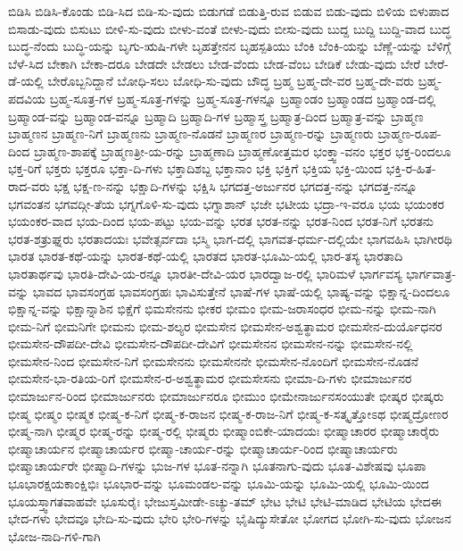 {ಬಿಡಿಸಿ
ಬಿಡಿಸಿ-ಕೊಂಡು
ಬಿಡಿ-ಸಿದ
ಬಿಡಿ-ಸು-ವುದು
ಬಿಡುಗಡೆ
ಬಿಡುತ್ತಿ-ರುವ
ಬಿಡುವ
ಬಿಡು-ವುದು
ಬಿಳಿಯ
ಬಿಳುಪಾದ
ಬಿಸಾಡು-ವುದು
ಬಿಸುಟು
ಬೀಳಿ-ಸು-ವುದು
ಬೀಳು-ವಂತೆ
ಬೀಳು-ವುದು
ಬೀಸು-ವುದು
ಬುದ್ದ
ಬುದ್ದಿ
ಬುದ್ದಿ-ವಾದ
ಬುದ್ಧ
ಬುದ್ಧ-ನೆಂದು
ಬುದ್ಧಿ-ಯನ್ನು
ಬೃಗು-ಋಷಿ-ಗಳೇ
ಬೃಹತ್ತೇನನ
ಬೃಹಸ್ಪತಿಯು
ಬೆಂಕಿ
ಬೆಂಕಿ-ಯನ್ನು
ಬೆಣ್ಣೆ-ಯನ್ನು
ಬೆಳಿಗ್ಗೆ
ಬೆಳೆ-ಸಿದ
ಬೇಕಾಗಿ
ಬೇಕಾ-ದರೂ
ಬೇಡದೇ
ಬೇಡಲು
ಬೇಡ-ವೆಂದು
ಬೇಡ-ವೆಂಬ
ಬೇಡಿಕೆ
ಬೇಡು-ವುದು
ಬೇರೆ
ಬೇರೆ-ಡೆ-ಯಲ್ಲಿ
ಬೇರೊಬ್ಬನಿದ್ದಾನೆ
ಬೋಧಿ-ಸಲು
ಬೋಧಿ-ಸು-ವುದು
ಬೌದ್ಧ
ಬ್ರಹ್ಮ
ಬ್ರಹ್ಮ-ದೇ-ವರ
ಬ್ರಹ್ಮ-ದೇ-ವರು
ಬ್ರಹ್ಮ-ಪದವಿಯ
ಬ್ರಹ್ಮ-ಸೂತ್ರ-ಗಳ
ಬ್ರಹ್ಮ-ಸೂತ್ರ-ಗಳನ್ನು
ಬ್ರಹ್ಮ-ಸೂತ್ರ-ಗಳನ್ನೂ
ಬ್ರಹ್ಮಾಂಡಂ
ಬ್ರಹ್ಮಾಂಡದ
ಬ್ರಹ್ಮಾಂಡ-ದಲ್ಲಿ
ಬ್ರಹ್ಮಾಂಡ-ವನ್ನು
ಬ್ರಹ್ಮಾಂಡ-ವನ್ನೂ
ಬ್ರಹ್ಮಾದಿ
ಬ್ರಹ್ಮಾದಿ-ಗಳ
ಬ್ರಹ್ಮಾಸ್ತ್ರ
ಬ್ರಹ್ಮಾತ್ರ-ದಿಂದ
ಬ್ರಹ್ಮಾತ್ರ-ವನ್ನು
ಬ್ರಾಹ್ಮಣ
ಬ್ರಾಹ್ಮಣನ
ಬ್ರಾಹ್ಮಣ-ನಿಗೆ
ಬ್ರಾಹ್ಮಣನು
ಬ್ರಾಹ್ಮಣ-ನೊಡನೆ
ಬ್ರಾಹ್ಮಣರ
ಬ್ರಾಹ್ಮಣ-ರನ್ನು
ಬ್ರಾಹ್ಮಣರು
ಬ್ರಾಹ್ಮಣ-ರೂಪ-ದಿಂದ
ಬ್ರಾಹ್ಮಣ-ಶಾಪಕ್ಕೆ
ಬ್ರಾಹ್ಮಣತ್ರೀ-ಯ-ರನ್ನು
ಬ್ರಾಹ್ಮಣಾದಿ
ಬ್ರಾಹ್ಮಣೋತ್ತಮರ
ಭಂಕ್ತ್ವಾ-ವನಂ
ಭಕ್ತರ
ಭಕ್ತ-ರಿಂದಲೂ
ಭಕ್ತ-ರಿಗೆ
ಭಕ್ತರು
ಭಕ್ತರೂ
ಭಕ್ತಾ-ದಿ-ಗಳು
ಭಕ್ತಾದಿಶಬ್ದ
ಭಕ್ತಾನಾಂ
ಭಕ್ತಿ
ಭಕ್ತಿಗೆ
ಭಕ್ತಿಯ
ಭಕ್ತಿ-ಯಿಂದ
ಭಕ್ತಿ-ರ-ಹಿತ-ರಾದ-ವರು
ಭಕ್ಷ
ಭಕ್ಷ-ಣ-ನನ್ನು
ಭಕ್ಷಾದಿ-ಗಳನ್ನು
ಭಕ್ಷಿಸಿ
ಭಗದತ್ತ-ಅರ್ಜುನರ
ಭಗದತ್ತ-ನನ್ನು
ಭಗದತ್ತ-ನನ್ನೂ
ಭಗವಂತನ
ಭಗವದ್ಗೀ-ತೆಯ
ಭಗ್ನಗೊಳಿ-ಸು-ವುದು
ಭಗ್ನಾಶಾನ್
ಭಜೇ
ಭಟೀಯ
ಭದ್ರಾ-ಇ-ವರೂ
ಭಯ
ಭಯಂಕರ
ಭಯಂಕರ-ವಾದ
ಭಯ-ದಿಂದ
ಭಯ-ಪಟ್ಟು
ಭಯ-ವನ್ನು
ಭರತ
ಭರತ-ನನ್ನು
ಭರತ-ನಿಂದ
ಭರತ-ನಿಗೆ
ಭರತನು
ಭರತ-ಶತ್ರುಘ್ನರು
ಭರತಾದಯಃ
ಭವೇತ್ಸರ್ವದಾ
ಭಸ್ಮಿ
ಭಾಗ-ದಲ್ಲಿ
ಭಾಗವತ-ಧರ್ಮ-ದಲ್ಲಿಯೇ
ಭಾಗವಹಿಸಿ
ಭಾಗೀರಥಿ
ಭಾರತ
ಭಾರತ-ಕಥೆ-ಯನ್ನು
ಭಾರತ-ಕಥೆ-ಯಲ್ಲಿ
ಭಾರತದ
ಭಾರತ-ಭೂಮಿ-ಯಲ್ಲಿ
ಭಾರ-ತಸ್ಯ
ಭಾರತಾದಿ
ಭಾರತಾರ್ಥವು
ಭಾರತಿ-ದೇವಿ-ಯ-ರನ್ನೂ
ಭಾರತೀ-ದೇವಿ-ಯರ
ಭಾರದ್ವಾಜ-ರಲ್ಲಿ
ಭಾರಿಮಳೆ
ಭಾರ್ಗವಸ್ಯ
ಭಾರ್ಗವಾತ್ರ-ವನ್ನು
ಭಾವದ
ಭಾವಸಂಗ್ರಹ
ಭಾವಸಂಗ್ರಹಃ
ಭಾವಿಸುತ್ತೇನೆ
ಭಾಷೆ-ಗಳ
ಭಾಷೆ-ಯಲ್ಲಿ
ಭಾಷ್ಯ-ವನ್ನು
ಭಿಕ್ಷಾನ್ನ-ದಿಂದಲೂ
ಭಿಕ್ಷಾನ್ನ-ವನ್ನು
ಭಿಕ್ಷಾನ್ನಾಶಿನ
ಭಿಕ್ಷೆಗೆ
ಭಿಮಸೇನನು
ಭೀಕರ
ಭೀಮಂ
ಭೀಮ-ಜರಾಸಂಧರ
ಭೀಮ-ನನ್ನು
ಭೀಮ-ನಾಗಿ
ಭೀಮ-ನಿಗೆ
ಭೀಮನಿಗೇ
ಭೀಮನು
ಭೀಮ-ಶಲ್ಯರ
ಭೀಮಸೇನ
ಭೀಮಸೇನ-ಅಶ್ವತ್ಥಾಮರ
ಭೀಮಸೇನ-ದುರ್ಯೊಧನರ
ಭೀಮಸೇನ-ದೌಪದೀ-ದೇವಿ
ಭೀಮಸೇನ-ದೌಪದೀ-ದೇವಿಗೆ
ಭೀಮಸೇನನ
ಭೀಮಸೇನ-ನನ್ನು
ಭೀಮಸೇನ-ನಲ್ಲಿ
ಭೀಮಸೇನ-ನಿಂದ
ಭೀಮಸೇನ-ನಿಗೆ
ಭೀಮಸೇನನು
ಭೀಮಸೇನನೇ
ಭೀಮಸೇನ-ನೊಂದಿಗೆ
ಭೀಮಸೇನ-ನೊಡನೆ
ಭೀಮಸೇನ-ಭಾ-ರತಿಯ-ರಿಗೆ
ಭೀಮಸೇನ-ರ-ಅಶ್ವತ್ಥಾಮರ
ಭೀಮಸೇಸನು
ಭೀಮಾ-ದಿ-ಗಳು
ಭೀಮಾರ್ಜುನರ
ಭೀಮಾರ್ಜುನ-ರಿಂದ
ಭೀಮಾರ್ಜುನರು
ಭೀಮಾರ್ಜುನರೂ
ಭೀಮುಂ
ಭೀಮೇನಾರ್ಜುನಸಂಯುತೇ
ಭೀಷ್ಕರ
ಭೀಷ್ಕರು
ಭೀಷ್ಮ
ಭೀಷ್ಮಂ
ಭೀಷ್ಮಕ
ಭೀಷ್ಮ-ಕ-ನಿಗೆ
ಭೀಷ್ಮ-ಕ-ರಾಜನ
ಭೀಷ್ಮ-ಕ-ರಾಜ-ನಿಗೆ
ಭೀಷ್ಮ-ಕ-ಸತ್ಕೃತ್ತೋಽಥ
ಭೀಷ್ಮದ್ರೋಣರ
ಭೀಷ್ಮ-ನಾಗಿ
ಭೀಷ್ಮರ
ಭೀಷ್ಮ-ರನ್ನು
ಭೀಷ್ಮ-ರಲ್ಲಿ
ಭೀಷ್ಮರು
ಭೀಷ್ಮಾಂಬಿಕೇ-ಯಾದಯಃ
ಭೀಷ್ಮಾಚಾರರ
ಭೀಷ್ಮಾಚಾರೈರು
ಭೀಷ್ಮಾಚಾರ್ಯನ
ಭೀಷ್ಮಾಚಾರ್ಯರ
ಭೀಷ್ಮಾ-ಚಾರ್ಯ-ರನ್ನು
ಭೀಷ್ಮಾಚಾರ್ಯ-ರಿಂದ
ಭೀಷ್ಮಾಚಾರ್ಯರು
ಭೀಷ್ಮಾಚಾರ್ಯರೇ
ಭೀಷ್ಮಾದಿ-ಗಳನ್ನು
ಭುಜ-ಗಳ
ಭೂತ-ನನ್ನಾಗಿ
ಭೂತನಾಗು-ವುದು
ಭೂತ-ವಿಶೇಷವು
ಭೂಪಾ
ಭೂಭಾರಕ್ಷಯಕಾಂಕ್ಷಿಭಿಃ
ಭೂಭಾರ-ವನ್ನು
ಭೂಮಂಡಲ-ವನ್ನು
ಭೂಮಿ-ಯನ್ನು
ಭೂಮಿ-ಯಲ್ಲಿ
ಭೂಮಿ-ಯಿಂದ
ಭೂಯಸ್ತ್ವಾಗತವಾಹವೇ
ಭೂಸುರೈಃ
ಭೇಜುಸ್ತಮೀಡೇ-ಽಚ್ಯು-ತಮ್
ಭೇಟ
ಭೇಟಿ
ಭೇಟಿ-ಮಾಡಿದ
ಭೇಟಿಯ
ಭೇದಈ
ಭೇದ-ಗಳು
ಭೇದವೂ
ಭೇದಿ-ಸು-ವುದು
ಭೇರಿ
ಭೇರಿ-ಗಳನ್ನು
ಭೈಷಿದ್ಯುಸೇತೋ
ಭೋಗದ
ಭೋಗಿ-ಸು-ವುದು
ಭೋಜನ
ಭೋಜ-ನಾದಿ-ಗಳಿ-ಗಾಗಿ
}

